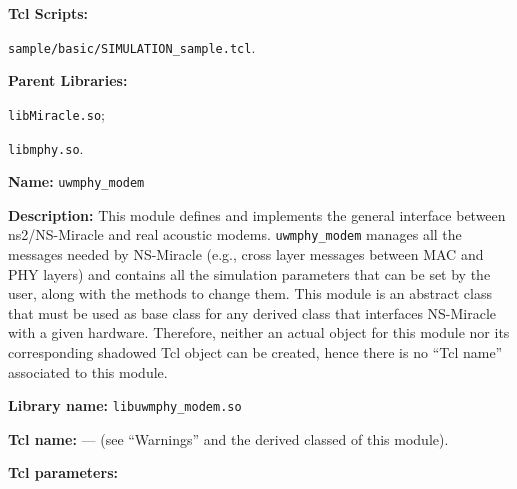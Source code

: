 \begin{description}
   \item {\bf Tcl Scripts:}
      \begin{description}
		\item {\tt sample/basic/SIMULATION\_sample.tcl}.
	   \end{description} 
   \item {\bf Parent Libraries:}
      \begin{description}
		\item {\tt libMiracle.so};
      \item {\tt libmphy.so}.
	   \end{description} 
\end{description}

\vspace{1 cm}

\begin{description}
   \item {\bf Name:} {\tt uwmphy\_modem}
   \item {\bf Description:} This module defines and implements the general interface between ns2/NS-Miracle and real acoustic modems.     {\tt uwmphy\_modem} manages all the messages needed by NS-Miracle (e.g., cross layer messages between MAC and PHY layers) and contains all the simulation parameters that can be set by the user, along with the methods to change them. This module is an abstract class that must be used as base class for any derived class that interfaces NS-Miracle with a given hardware. Therefore, neither an actual object for this module nor its corresponding shadowed Tcl object can be created, hence there is no ``Tcl name'' associated to this module.
   \item {\bf Library name:} {\tt libuwmphy\_modem.so}
   \item {\bf Tcl name:} --- (see ``Warnings'' and the derived classed of this module).
   \item {\bf Tcl parameters:}
 

\end{description}
